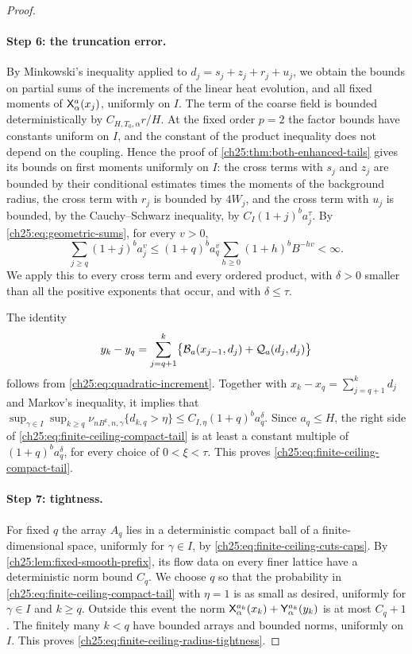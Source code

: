 \begin{proof}
\paragraph{Step 6: the truncation error.}
By Minkowski's inequality applied to $d_j=s_j+z_j+r_j+u_j$, we obtain the bounds on partial sums of the increments of the linear heat evolution, and all fixed moments of $\mathsf X_{\alpha}^{a}(x_j)$, uniformly on $I$. The term of the coarse field is bounded deterministically by $C_{H,T_0,\alpha}r/H$. At the fixed order $p=2$ the factor bounds have constants uniform on $I$, and the constant of the product inequality does not depend on the coupling. Hence the proof of \cref{ch25:thm:both-enhanced-tails} gives its bounds on first moments uniformly on $I$: the cross terms with $s_j$ and $z_j$ are bounded by their conditional estimates times the moments of the background radius, the cross term with $r_j$ is bounded by $4W_j$, and the cross term with $u_j$ is bounded, by the Cauchy--Schwarz inequality, by $C_I(1+j)^ba_j^\tau$. By \eqref{ch25:eq:geometric-sums}, for every $v>0$,
\[
 \sum_{j\ge q}(1+j)^ba_j^v\le(1+q)^ba_q^v\sum_{h\ge0}(1+h)^bB^{-hv}<\infty.
\]
We apply this to every cross term and every ordered product, with $\delta>0$ smaller than all the positive exponents that occur, and with $\delta\le\tau$.

The identity
\[
 y_k-y_q=\sum_{j=q+1}^k\bigl\{\mathcal B_{a}(x_{j-1},d_j)+\mathcal Q_{a}(d_j,d_j)\bigr\}
\]
follows from \eqref{ch25:eq:quadratic-increment}. Together with $x_k-x_q=\sum_{j=q+1}^kd_j$ and Markov's inequality, it implies that $\sup_{\gamma\in I}\sup_{k\ge q}\nu_{nB^k,n,\gamma}\{d_{k,q}>\eta\}\le C_{I,\eta}(1+q)^ba_q^\delta$. Since $a_q\le H$, the right side of \eqref{ch25:eq:finite-ceiling-compact-tail} is at least a constant multiple of $(1+q)^ba_q^\delta$, for every choice of $0<\xi<\tau$. This proves \eqref{ch25:eq:finite-ceiling-compact-tail}.

\paragraph{Step 7: tightness.}
For fixed $q$ the array $A_q$ lies in a deterministic compact ball of a finite-dimensional space, uniformly for $\gamma\in I$, by \eqref{ch25:eq:finite-ceiling-cuts-caps}. By \cref{ch25:lem:fixed-smooth-prefix}, its flow data on every finer lattice have a deterministic norm bound $C_q$. We choose $q$ so that the probability in \eqref{ch25:eq:finite-ceiling-compact-tail} with $\eta=1$ is as small as desired, uniformly for $\gamma\in I$ and $k\ge q$. Outside this event the norm $\mathsf X_{\alpha}^{a_k}(x_k)+\mathsf Y_{\alpha}^{a_k}(y_k)$ is at most $C_q+1$. The finitely many $k<q$ have bounded arrays and bounded norms, uniformly on $I$. This proves \eqref{ch25:eq:finite-ceiling-radius-tightness}.
\end{proof}

